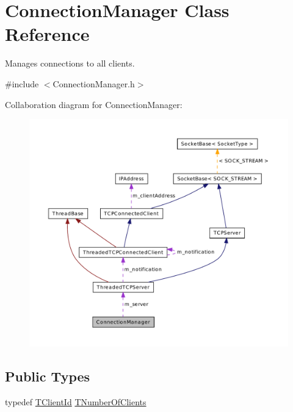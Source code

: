 \hypertarget{class_connection_manager}{\section{Connection\-Manager Class Reference}
\label{class_connection_manager}
}


Manages connections to all clients.  




{\ttfamily \#include $<$Connection\-Manager.\-h$>$}



Collaboration diagram for Connection\-Manager\-:\nopagebreak
\begin{figure}[H]
\begin{center}
\leavevmode
\includegraphics[width=350pt]{class_connection_manager__coll__graph}
\end{center}
\end{figure}
\subsection*{Public Types}
\begin{DoxyCompactItemize}
\item 
typedef \hyperlink{class_connection_manager_a0c3634c02b95af84a477b253fcf2b29a}{T\-Client\-Id} \hyperlink{class_connection_manager_a0f5f5b25b063cfebfac54b25cda131f7}{T\-Number\-Of\-Clients}
\end{DoxyCompactItemize}
